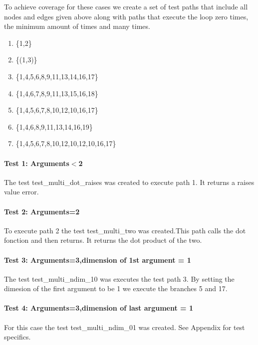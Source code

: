 To achieve coverage for these cases we create a set of test paths that include all nodes and edges given above along with paths that execute the loop zero times, the minimum amount of times and many times. 

\begin{enumerate}
\item \{1,2\}  
\item \{(1,3)\}
\item \{1,4,5,6,8,9,11,13,14,16,17\}
\item \{1,4,6,7,8,9,11,13,15,16,18\}
\item \{1,4,5,6,7,8,10,12,10,16,17\}
\item \{1,4,6,8,9,11,13,14,16,19\}
\item \{1,4,5,6,7,8,10,12,10,12,10,16,17\}
\end{enumerate}



\paragraph{Test 1: Arguments$<$2}


The test test\_multi\_dot\_raises was created to execute path 1. It returns a raises value error.


\paragraph{Test 2: Arguments=2}

To execute path 2 the test test\_multi\_two was created.This path calls the dot fonction and then returns. It returns the dot product of the two.


\paragraph{Test 3: Arguments=3,dimension of 1st argument = 1}

The test test\_multi\_ndim\_10 was executes the test path 3. By setting the dimesion of the first argument to be 1 we execute the branches 5 and 17.




\paragraph{Test 4: Arguments=3,dimension of last argument = 1}

For this case the test test\_multi\_ndim\_01 was created. See Appendix for test specifics.


